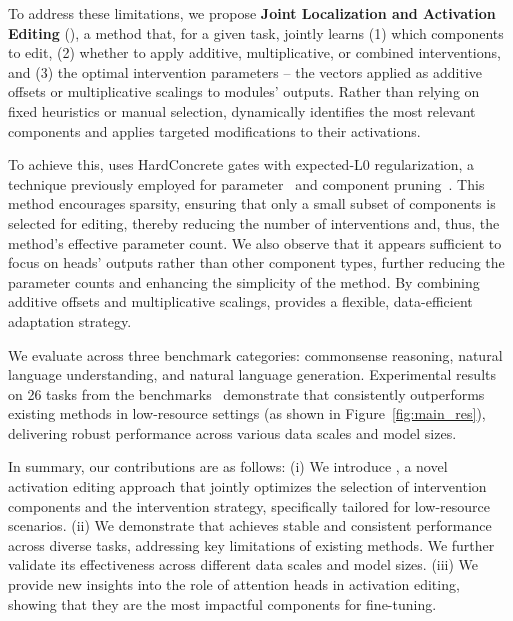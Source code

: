 To address these limitations, we propose \textbf{Joint Localization and Activation Editing} (\textbf{\jola{}}), a method that, for a given task, jointly learns (1) which components to edit, (2) whether to apply additive, multiplicative, or combined interventions, and (3) the optimal intervention parameters -- the vectors applied as additive offsets or multiplicative scalings to modules' outputs. Rather than relying on fixed heuristics or manual selection, \jola{} dynamically identifies the most relevant components and applies targeted modifications to their activations.

To achieve this, \jola{} uses HardConcrete gates with expected-L0 regularization, a technique previously employed for parameter~\cite{louizos2018learning} and component pruning~\cite{voita-etal-2019-analyzing}. 
This method encourages sparsity, ensuring that only a small subset of components is selected for editing, thereby reducing the number of interventions and, thus, the method’s effective parameter count. We also observe that it appears sufficient to focus on heads' outputs rather than other component types, further reducing the parameter counts and enhancing the simplicity of the method. By combining additive offsets and multiplicative scalings, \jola{} provides a flexible, data-efficient adaptation strategy. 

We evaluate \jola{} across three benchmark categories: commonsense reasoning, natural language understanding, and natural language generation.
Experimental results on 26 tasks from the benchmarks~\cite{hu-etal-2023-llm, wang2024mmlu, gehrmann-etal-2022-gemv2} demonstrate that \jola{} consistently outperforms existing methods in low-resource settings (as shown in Figure~\ref{fig:main_res}), delivering robust performance across various data scales and model sizes.

In summary, our contributions are as follows:
(i) We introduce \jola{}, a novel activation editing approach that jointly optimizes the selection of intervention components and the intervention strategy, specifically tailored for low-resource scenarios.
(ii) We demonstrate that \jola{} achieves stable and consistent performance across diverse tasks, addressing key limitations of existing methods. We further validate its effectiveness across different data scales and model sizes.
(iii) We provide new insights into the role of attention heads in activation editing, showing that they are the most impactful components for fine-tuning.